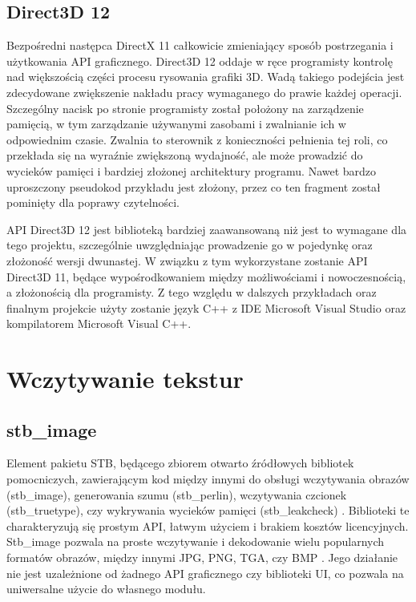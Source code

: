 \subsection{Direct3D 12}

Bezpośredni następca DirectX 11 całkowicie zmieniający sposób
postrzegania i użytkowania API graficznego. Direct3D 12 oddaje w ręce
programisty kontrolę nad większością części procesu rysowania grafiki
3D. Wadą takiego podejścia jest zdecydowane zwiększenie nakładu pracy
wymaganego do prawie każdej operacji. Szczególny nacisk po stronie
programisty został położony na zarządzenie pamięcią, w tym zarządzanie
używanymi zasobami i zwalnianie ich w odpowiednim czasie. Zwalnia to
sterownik z konieczności pełnienia tej roli, co przekłada się na
wyraźnie zwiększoną wydajność, ale może prowadzić do wycieków pamięci i
bardziej złożonej architektury programu. Nawet bardzo uproszczony pseudokod przykładu jest złożony, przez co ten fragment został pominięty dla poprawy czytelności.

API Direct3D 12 jest biblioteką bardziej zaawansowaną niż jest to
wymagane dla tego projektu, szczególnie uwzględniając prowadzenie go w
pojedynkę oraz złożoność wersji dwunastej. W związku z tym wykorzystane
zostanie API Direct3D 11, będące wypośrodkowaniem między możliwościami i
nowoczesnością, a złożonością dla programisty. Z tego względu w dalszych
przykładach oraz finalnym projekcie użyty zostanie język C++ z IDE
Microsoft Visual Studio oraz kompilatorem Microsoft Visual C++.

\section{Wczytywanie tekstur}

\subsection{stb\_image}

Element pakietu STB, będącego zbiorem otwarto źródłowych bibliotek
pomocniczych, zawierającym kod między innymi do obsługi wczytywania
obrazów (stb\_image), generowania szumu (stb\_perlin), wczytywania
czcionek (stb\_truetype), czy wykrywania wycieków pamięci
(stb\_leakcheck) \cite{github:stb:2024}. Biblioteki te charakteryzują się prostym API,
łatwym użyciem i brakiem kosztów licencyjnych. Stb\_image pozwala na proste wczytywanie i dekodowanie wielu popularnych
formatów obrazów, między innymi JPG, PNG, TGA, czy BMP \cite{github:stb:2024}. Jego
działanie nie jest uzależnione od żadnego API graficznego czy biblioteki
UI, co pozwala na uniwersalne użycie do własnego modułu. 


